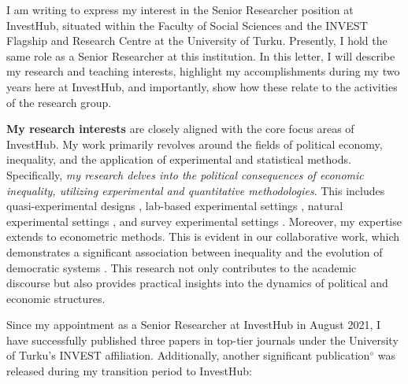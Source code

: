 \documentclass[10pt,stdletter,dateno,sigleft]{newlfm} %
\begin{document}
\begin{newlfm}


\vspace{-2cm}I am writing to express my interest in the Senior Researcher position at InvestHub, situated within the Faculty of Social Sciences and the INVEST Flagship and Research Centre at the University of Turku. Presently, I hold the same role as a Senior Researcher at this institution. In this letter, I will describe my research and teaching interests, highlight my accomplishments during my two years here at InvestHub, and importantly, show how these relate to the activities of the research group.

{\bf My research interests} are closely aligned with the core focus areas of InvestHub. My work primarily revolves around the fields of political economy, inequality, and the application of experimental and statistical methods. Specifically, \emph{my research delves into the political consequences of economic inequality, utilizing experimental and quantitative methodologies}. This includes quasi-experimental designs \parencite{Bahamonde2018}, lab-based experimental settings \parencite{Bahamonde2022b}, natural experimental settings \parencite{Bahamonde:2023}, and survey experimental settings \parencite{Bahamonde2020a}. Moreover, my expertise extends to econometric methods. This is evident in our collaborative work, which demonstrates a significant association between inequality and the evolution of democratic systems \parencite{Bahamonde2021}. This research not only contributes to the academic discourse but also provides practical insights into the dynamics of political and economic structures.

Since my appointment as a Senior Researcher at InvestHub in August 2021, I have successfully published three papers in top-tier journals under the University of Turku's INVEST affiliation. Additionally, another significant publication$^{\diamond}$ was released during my transition period to InvestHub: 


\end{newlfm}
\end{document}
